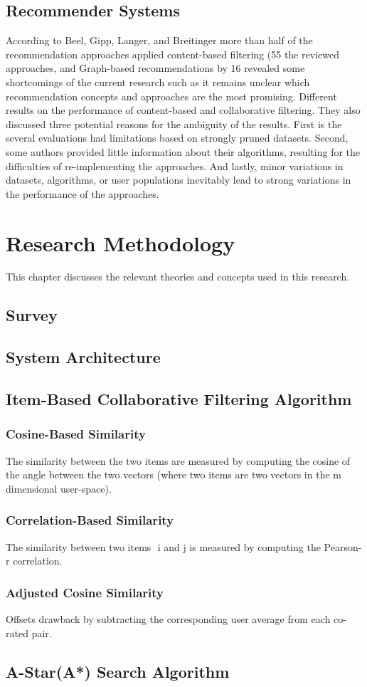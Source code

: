 \documentclass{report}
\begin{document}
\section{Recommender Systems}
According to Beel, Gipp, Langer, and Breitinger more than half of the recommendation
approaches applied content-based filtering (55%
the reviewed approaches, and Graph-based recommendations by 16%
revealed some shortcomings of the current research such as it remains unclear which
recommendation concepts and approaches are the most promising. Different results on the
performance of content-based and collaborative filtering. They also discussed three potential
reasons for the ambiguity of the results. First is the several evaluations had limitations based on
strongly pruned datasets. Second, some authors provided little information about their
algorithms, resulting for the difficulties of re-implementing the approaches. And lastly, minor
variations in datasets, algorithms, or user populations inevitably lead to strong variations in the
performance of the approaches.


\chapter{Research Methodology}
\label{chpt: Research Methodology}
This chapter discusses the relevant theories and concepts used in this research.
\section{Survey}

\newpage
\section{System Architecture}

\newpage
\section{Item-Based Collaborative Filtering Algorithm}
\subsection{Cosine-Based Similarity}
The similarity between the two items are measured by computing the cosine of the angle
between the two vectors (where two items are two vectors in the m dimensional user-space).
\subsection{Correlation-Based Similarity}
The similarity between two items ​ i and​ j is measured by computing the Pearson-r correlation.
\subsection{Adjusted Cosine Similarity}
Offsets drawback by subtracting the corresponding user average from each co-rated pair.

\newpage
\section{A-Star(A*) Search Algorithm}
\end{document}
